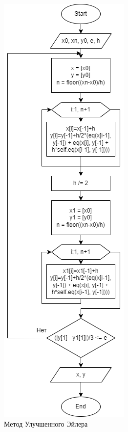 \documentclass{article}
\begin{document}
    		\begin{figure}[H]
    		\centering
    		\includegraphics[scale=0.7]{ee.png}
    		\caption[Схема-1]{Метод Улучшенного Эйлера}
    		\label{fig:screenshot003}
    	\end{figure}
\end{document}
